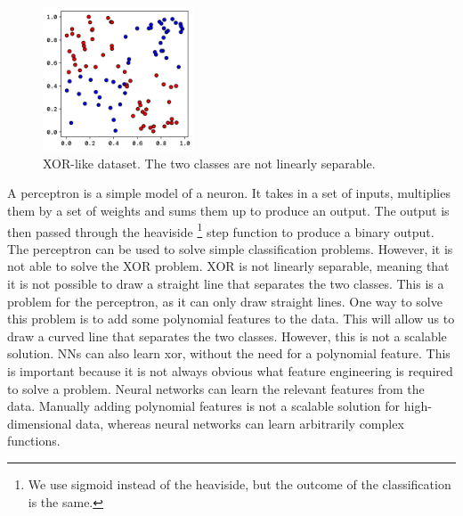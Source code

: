 \documentclass[twoside,11pt]{report}
\begin{document}
    \begin{figure}
        \begin{center}
            \includegraphics[width=0.4\textwidth]{../runsAndFigures/xor.png}
        \end{center}
        \caption{
            XOR-like dataset. The two classes are not linearly separable.
        }\label{fig:xor_data}
    \end{figure}

    A perceptron is a simple model of a neuron. It takes in a set of inputs, multiplies them by a set of weights 
    and sums them up to produce an output. The output is then passed through the heaviside
    \footnote{We use sigmoid instead of the heaviside, but the outcome of the classification is the same.}
    step function to produce
    a binary output. The perceptron can be used to solve simple classification problems. However, it is not able to
    solve the XOR problem. XOR is not linearly separable, meaning that it is not possible to draw a straight line
    that separates the two classes. This is a problem for the perceptron, as it can only draw straight lines.
    One way to solve this problem is to add some polynomial features to the data. 
    This will allow us to draw a curved line that separates the two classes. However, this is not a scalable solution.
    NNs can also learn xor, without the need for a polynomial feature. This is important because it is not 
    always obvious what feature engineering is required to solve a problem. Neural networks can learn the 
    relevant features from the data. Manually adding polynomial features is not a scalable solution for 
    high-dimensional data, whereas neural networks can learn arbitrarily complex functions. \\
\end{document}
